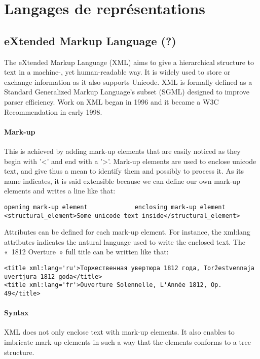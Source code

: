 \section{Langages de représentations}\label{s:mods}

\subsection{eXtended Markup Language (?)}
The eXtended Markup Language (XML) aims to give a hierarchical structure to  text in a machine-, yet human-readable way. It is widely used to store or exchange information as it also supports Unicode.
XML is formally defined as a Standard Generalized Markup Language's subset (SGML) designed to improve parser efficiency. Work on XML began in 1996 and it became a W3C Recommendation in early 1998.

\paragraph{Mark-up}
This is achieved by adding mark-up elements that are easily noticed as they begin with '<' and end with a '>'. Mark-up elements are used to enclose unicode text, and give thus a mean to identify them and possibly to process it. As its name indicates, it is said extensible because we can define our own mark-up elements and writes a line like that:

\begin{Verbatim}[fontsize=\small,formatcom=\color{black!70}]
opening mark-up element 			enclosing mark-up element
<structural_element>Some unicode text inside</structural_element>
\end{Verbatim}

Attributes can be defined for each mark-up element. 
For instance, the xml:lang attributes indicates the natural language used to write the enclosed text. The « 1812 Overture » full title can be written like that:
\begin{Verbatim}[fontsize=\small,formatcom=\color{black!70}]
<title xml:lang='ru'>Торжественная увертюра 1812 года, Toržestvennaja uvertjura 1812 goda</title>
<title xml:lang='fr'>Ouverture Solennelle, L'Année 1812, Op. 49</title>
\end{Verbatim}

\paragraph{Syntax}
XML does not only enclose text with mark-up elements. It also enables to imbricate mark-up elements in such a way that the elements conforms to a tree structure. 

